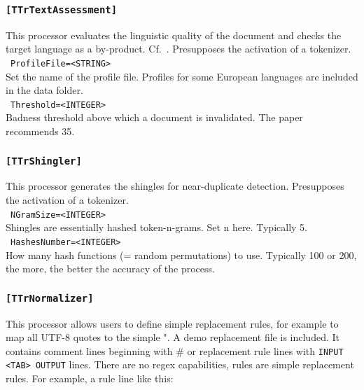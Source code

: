 \documentclass[12pt,a4paper]{article}
\begin{document}
\subsubsection{\texttt{[TTrTextAssessment]}}
\label{sec:textassessment}

This processor evaluates the linguistic quality of the document and checks the target language as a by-product.
Cf.\ \cite{SchaeferEa2013}.
Presupposes the activation of a tokenizer.\\

\noindent\textbullet~\texttt{ProfileFile=<STRING>}\\

Set the name of the profile file.
Profiles for some European languages are included in the data folder.\\

\noindent\textbullet~\texttt{Threshold=<INTEGER>}\\

Badness threshold above which a document is invalidated.
The paper recommends 35.\\


\subsubsection{\texttt{[TTrShingler]}}
\label{sec:shingler}

This processor generates the shingles for near-duplicate detection.
Presupposes the activation of a tokenizer.\\

\noindent\textbullet~\texttt{NGramSize=<INTEGER>}\\

Shingles are essentially hashed token-n-grams.
Set n here.
Typically 5.\\

\noindent\textbullet~\texttt{HashesNumber=<INTEGER>}\\

How many hash functions (= random permutations) to use.
Typically 100 or 200, the more, the better the accuracy of the process.\\


\subsubsection{\texttt{[TTrNormalizer]}}
\label{sec:normalizer}

This processor allows users to define simple replacement rules, for example to map all UTF-8 quotes to the simple ".
A demo replacement file is included.
It contains comment lines beginning with \# or replacement rule lines with \texttt{INPUT <TAB> OUTPUT} lines.
There are no regex capabilities, rules are simple replacement rules.
For example, a rule line like this:\\
\end{document}

